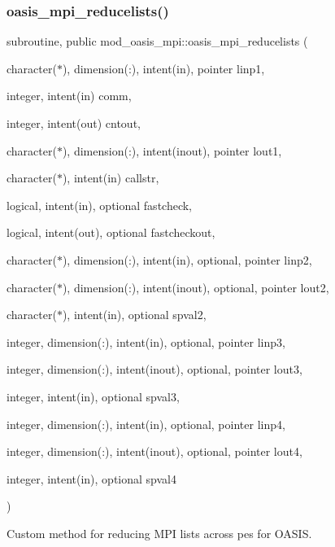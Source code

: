 \subsubsection{\texorpdfstring{oasis\+\_\+mpi\+\_\+reducelists()}{oasis\_mpi\_reducelists()}}
{\footnotesize\ttfamily subroutine, public mod\+\_\+oasis\+\_\+mpi\+::oasis\+\_\+mpi\+\_\+reducelists (\begin{DoxyParamCaption}\item[{character($\ast$), dimension(\+:), intent(in), pointer}]{linp1,  }\item[{integer, intent(in)}]{comm,  }\item[{integer, intent(out)}]{cntout,  }\item[{character($\ast$), dimension(\+:), intent(inout), pointer}]{lout1,  }\item[{character($\ast$), intent(in)}]{callstr,  }\item[{logical, intent(in), optional}]{fastcheck,  }\item[{logical, intent(out), optional}]{fastcheckout,  }\item[{character($\ast$), dimension(\+:), intent(in), optional, pointer}]{linp2,  }\item[{character($\ast$), dimension(\+:), intent(inout), optional, pointer}]{lout2,  }\item[{character($\ast$), intent(in), optional}]{spval2,  }\item[{integer, dimension(\+:), intent(in), optional, pointer}]{linp3,  }\item[{integer, dimension(\+:), intent(inout), optional, pointer}]{lout3,  }\item[{integer, intent(in), optional}]{spval3,  }\item[{integer, dimension(\+:), intent(in), optional, pointer}]{linp4,  }\item[{integer, dimension(\+:), intent(inout), optional, pointer}]{lout4,  }\item[{integer, intent(in), optional}]{spval4 }\end{DoxyParamCaption})}



Custom method for reducing M\+PI lists across pes for O\+A\+S\+IS. 


